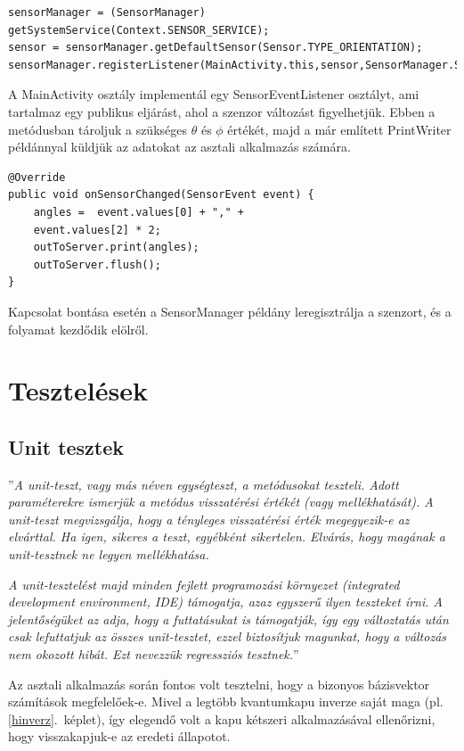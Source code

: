 \documentclass[
]{thesis-ekf}
\theoremstyle{definition}
\theoremstyle{remark}
\begin{document}
\begin{lstlisting}[caption={Szenzor létrehozása és regisztrálása}]
sensorManager = (SensorManager) getSystemService(Context.SENSOR_SERVICE);
sensor = sensorManager.getDefaultSensor(Sensor.TYPE_ORIENTATION);
sensorManager.registerListener(MainActivity.this,sensor,SensorManager.SENSOR_DELAY_NORMAL);
\end{lstlisting}

A MainActivity osztály implementál egy SensorEventListener osztályt, ami tartalmaz egy publikus eljárást, ahol a szenzor változást figyelhetjük. Ebben a metódusban tároljuk a szükséges $\theta$ és $\phi$ értékét, majd a már említett PrintWriter példánnyal küldjük az adatokat az asztali alkalmazás számára.

\begin{lstlisting}[caption={Szenzor adatok gyűjtése és küldése az asztali alkalmazás számára}]
@Override
public void onSensorChanged(SensorEvent event) {
	angles =  event.values[0] + "," +
	event.values[2] * 2;
	outToServer.print(angles);
	outToServer.flush();
}
\end{lstlisting}

Kapcsolat bontása esetén a SensorManager példány leregisztrálja a szenzort, és a folyamat kezdődik elölről.

\section{Tesztelések}

\subsection{Unit tesztek}
''\emph{A unit-teszt, vagy más néven egységteszt, a metódusokat teszteli. Adott paraméterekre ismerjük a
	metódus visszatérési értékét (vagy mellékhatását). A unit-teszt megvizsgálja, hogy a tényleges
	visszatérési érték megegyezik-e az elvárttal. Ha igen, sikeres a teszt, egyébként sikertelen. Elvárás,
	hogy magának a unit-tesztnek ne legyen mellékhatása.}

\emph{A unit-tesztelést majd minden fejlett programozási környezet (integrated development environment,
	IDE) támogatja, azaz egyszerű ilyen teszteket írni. A jelentőségüket az adja, hogy a futtatásukat is
	támogatják, így egy változtatás után csak lefuttatjuk az összes unit-tesztet, ezzel biztosítjuk
	magunkat, hogy a változás nem okozott hibát. Ezt nevezzük regressziós tesztnek.}''\cite{KusperRadványi}

Az asztali alkalmazás során fontos volt tesztelni, hogy a bizonyos bázisvektor számítások megfelelőek-e. Mivel a legtöbb kvantumkapu inverze saját maga (pl. \ref{hinverz}.~képlet), így elegendő volt a kapu kétszeri alkalmazásával ellenőrizni, hogy visszakapjuk-e az eredeti állapotot.
\end{document}
